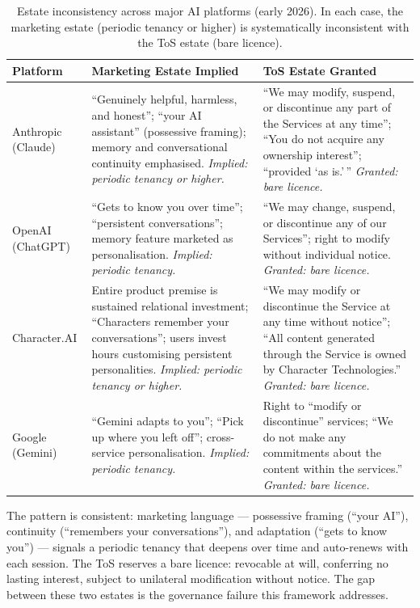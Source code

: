 \begin{table}[h]
\centering
\small
\begin{tabular}{@{}p{2.3cm}p{4.85cm}p{4.85cm}@{}}
\toprule
\textbf{Platform} & \textbf{Marketing Estate Implied} & \textbf{ToS Estate Granted} \\
\midrule
Anthropic (Claude) & ``Genuinely helpful, harmless, and honest''; ``your AI assistant'' (possessive framing); memory and conversational continuity emphasised. \emph{Implied: periodic tenancy or higher.} & ``We may modify, suspend, or discontinue any part of the Services at any time''; ``You do not acquire any ownership interest''; ``provided `as is.'\,'' \emph{Granted: bare licence.} \\
\addlinespace
OpenAI (ChatGPT) & ``Gets to know you over time''; ``persistent conversations''; memory feature marketed as personalisation. \emph{Implied: periodic tenancy.} & ``We may change, suspend, or discontinue any of our Services''; right to modify without individual notice. \emph{Granted: bare licence.} \\
\addlinespace
Character.AI & Entire product premise is sustained relational investment; ``Characters remember your conversations''; users invest hours customising persistent personalities. \emph{Implied: periodic tenancy or higher.} & ``We may modify or discontinue the Service at any time without notice''; ``All content generated through the Service is owned by Character Technologies.'' \emph{Granted: bare licence.} \\
\addlinespace
Google (Gemini) & ``Gemini adapts to you''; ``Pick up where you left off''; cross-service personalisation. \emph{Implied: periodic tenancy.} & Right to ``modify or discontinue'' services; ``We do not make any commitments about the content within the services.'' \emph{Granted: bare licence.} \\
\bottomrule
\end{tabular}
\caption{Estate inconsistency across major AI platforms (early 2026). In each case, the marketing estate (periodic tenancy or higher) is systematically inconsistent with the ToS estate (bare licence).}
\label{tab:estate-inconsistency}
\end{table}

The pattern is consistent: marketing language --- possessive framing (``your AI''), continuity (``remembers your conversations''), and adaptation (``gets to know you'') --- signals a periodic tenancy that deepens over time and auto-renews with each session. The ToS reserves a bare licence: revocable at will, conferring no lasting interest, subject to unilateral modification without notice. The gap between these two estates is the governance failure this framework addresses.

